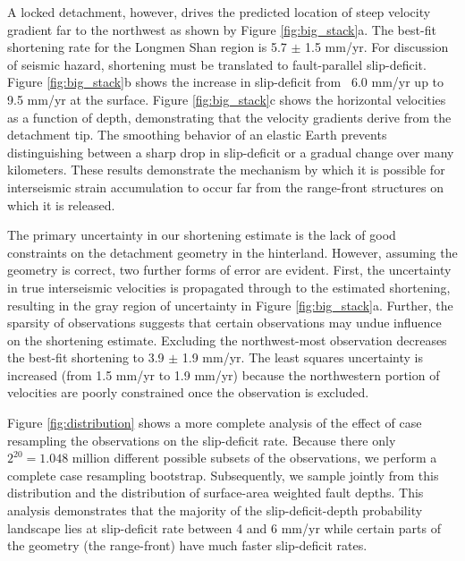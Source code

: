 \documentclass[12pt]{article}
\begin{document}
A locked detachment, however, drives the predicted location of steep velocity gradient far to the northwest as shown by Figure \ref{fig:big_stack}a. The best-fit shortening rate for the Longmen Shan region is 5.7 $\pm$ 1.5 mm/yr. For discussion of seismic hazard, shortening must be translated to fault-parallel slip-deficit. Figure \ref{fig:big_stack}b shows the increase in slip-deficit from ~6.0 mm/yr up to 9.5 mm/yr at the surface. Figure \ref{fig:big_stack}c shows the horizontal velocities as a function of depth, demonstrating that the velocity gradients derive from the detachment tip. The smoothing behavior of an elastic Earth prevents distinguishing between a sharp drop in slip-deficit or a gradual change over many kilometers. These results demonstrate the mechanism by which it is possible for interseismic strain accumulation to occur far from the range-front structures on which it is released.

The primary uncertainty in our shortening estimate is the lack of good constraints on the detachment geometry in the hinterland. However, assuming the geometry is correct, two further forms of error are evident. First, the uncertainty in true interseismic velocities is propagated through to the estimated shortening, resulting in the gray region of uncertainty in Figure \ref{fig:big_stack}a. Further, the sparsity of observations suggests that certain observations may undue influence on the shortening estimate. Excluding the northwest-most observation decreases the best-fit shortening to 3.9 $\pm$ 1.9 mm/yr. The least squares uncertainty is increased (from 1.5 mm/yr to 1.9 mm/yr) because the northwestern portion of velocities are poorly constrained once the observation is excluded. 

Figure \ref{fig:distribution} shows a more complete analysis of the effect of case resampling the observations on the slip-deficit rate. Because there only $2^{20} = 1.048 $ million different possible subsets of the observations, we perform a complete case resampling bootstrap. Subsequently, we sample jointly from this distribution and the distribution of surface-area weighted fault depths. This analysis demonstrates that the majority of the slip-deficit-depth probability landscape lies at slip-deficit rate between 4 and 6 mm/yr while certain parts of the geometry (the range-front) have much faster slip-deficit rates.
\end{document}
